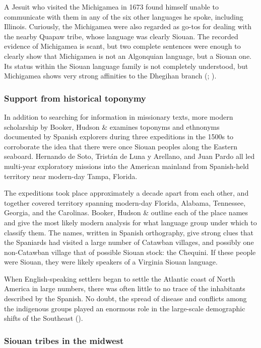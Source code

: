 \documentclass[output=paper]{LSP/langsci}
\begin{document}
A Jesuit who visited the Michigamea in 1673 found himself unable to communicate with them in any of the six other languages he spoke, including Illinois. Curiously, the Michigamea were also regarded as go-tos for dealing with the nearby Quapaw tribe, whose language was clearly Siouan. The recorded evidence of Michigamea is scant, but two complete sentences were enough to clearly show that Michigamea is not an Algonquian language, but a Siouan one. Its status within the Siouan language family is not completely understood, but Michigamea shows very strong affinities to the Dhegihan branch (\citealt{Koontz1995a}; \citealt{Koontz1995b}).

\subsubsection{Support from historical toponymy} In addition to searching for information in missionary texts, more modern scholarship by Booker, Hudson \& \citet{Rankin1992} examines toponyms and ethnonyms documented by Spanish explorers during three expeditions in the 1500s to corroborate the idea that there were once Siouan peoples along the Eastern seaboard. Hernando de Soto, Trist\'an de Luna y Arellano, and Juan Pardo all led multi-year exploratory missions into the American mainland from Spanish-held territory near modern-day Tampa, Florida. 

The expeditions took place approximately a decade apart from each other, and together covered territory spanning modern-day Florida, Alabama, Tennessee, Georgia, and the Carolinas. Booker, Hudson \& \citet{Rankin1992} outline each of the place names and give the most likely modern analysis for what language group under which to classify them. The names, written in Spanish orthography, give strong clues that the Spaniards had visited a large number of Catawban villages, and possibly one non-Catawban village that of possible Siouan stock: the Chequini. If these people were Siouan, they were likely speakers of a Virginia Siouan language.

When English-speaking settlers began to settle the Atlantic coast of North America in large numbers, there was often little to no trace of the inhabitants described by the Spanish. No doubt, the spread of disease and conflicts among the indigenous groups played an enormous role in the large-scale demographic shifts of the Southeast (\citealt{Mann2006}). 

\subsubsection{Siouan tribes in the midwest}
\end{document}
